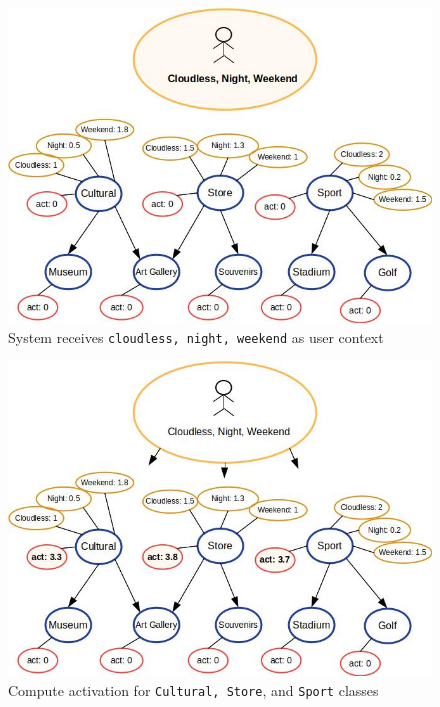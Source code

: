 \begin{figure}[h]
\centering
\includegraphics[scale=0.45]{draws/initial_act.jpg}
\caption{System receives {\tt cloudless, night, weekend} as user context}
\label{fig:init_act}
\end{figure}


\begin{figure}[h]
\centering
\includegraphics[scale=0.45]{draws/high_act.jpg}
\caption{Compute activation for {\tt Cultural, Store}, and {\tt Sport} classes}
\label{fig:high_act}
\end{figure}

